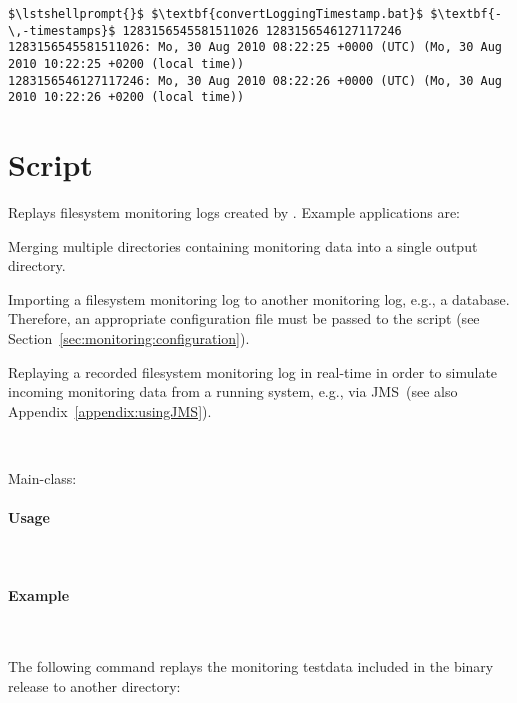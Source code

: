 \begin{lstlisting}[caption=Execution under Windows]
$\lstshellprompt{}$ $\textbf{convertLoggingTimestamp.bat}$ $\textbf{-\,-timestamps}$ 1283156545581511026 1283156546127117246 
1283156545581511026: Mo, 30 Aug 2010 08:22:25 +0000 (UTC) (Mo, 30 Aug 2010 10:22:25 +0200 (local time))
1283156546127117246: Mo, 30 Aug 2010 08:22:26 +0000 (UTC) (Mo, 30 Aug 2010 10:22:26 +0200 (local time))
\end{lstlisting}


\section{Script }

Replays filesystem monitoring logs created by \KiekerMonitoringPart{}. %
Example applications are:
\begin{compactitem}
\item Merging multiple directories containing monitoring data into a single %
output directory. 
\item Importing a filesystem monitoring log to another monitoring log, e.g., %
a database. Therefore, an appropriate \KiekerMonitoringPart{} configuration %
file must be passed to the script (see Section~\ref{sec:monitoring:configuration}).
\item Replaying a recorded filesystem monitoring log in real-time in order to simulate %
incoming monitoring data from a running system, e.g., via JMS~(see also Appendix~\ref{appendix:usingJMS}). 
\end{compactitem}

\

\noindent Main-class: {\small {}}

\paragraph*{Usage}\

\setTextListing


\paragraph*{Example}\

\noindent The following command replays the monitoring testdata included in %
the binary release to another directory:

